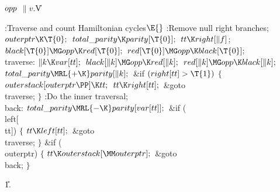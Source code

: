 \Y\B\4\D$\\{opp}$ \5
$\|v.{}$\|V\par
\Y\B\4:Traverse and count Hamiltonian cycles\X${}\E{}$\6
:Remove null right branches\X;\6
${}\\{outerptr}\K\T{0};{}$\6
${}\\{total\_parity}\K\\{parity}[\T{0}];{}$\6
${}\\{tt}\K\\{right}[\|f]{}$;\6
${}\\{black}[\T{0}]\MG\\{opp}\K\\{red}[\T{0}];{}$\6
${}\\{red}[\T{0}]\MG\\{opp}\K\\{black}[\T{0}];{}$\6
\4\\{traverse}:\5
${}\|k\K\\{var}[\\{tt}];{}$\6
${}\\{black}[\|k]\MG\\{opp}\K\\{red}[\|k];{}$\6
${}\\{red}[\|k]\MG\\{opp}\K\\{black}[\|k];{}$\6
${}\\{total\_parity}\MRL{+{\K}}\\{parity}[\|k];{}$\6
\&{if} ${}(\\{right}[\\{tt}]>\T{1}){}$\5
${}\{{}$\1\6
${}\\{outerstack}[\\{outerptr}\PP]\K\\{tt};{}$\6
${}\\{tt}\K\\{right}[\\{tt}];{}$\6
\&{goto} \\{traverse};\6
\4${}\}{}$\2\6
:Do the inner traversal\X;\6
\4\\{back}:\5
${}\\{total\_parity}\MRL{-{\K}}\\{parity}[\\{var}[\\{tt}]];{}$\6
\&{if} (\\{left}[\\{tt}])\5
${}\{{}$\1\6
${}\\{tt}\K\\{left}[\\{tt}];{}$\6
\&{goto} \\{traverse};\6
\4${}\}{}$\2\6
\&{if} (\\{outerptr})\5
${}\{{}$\1\6
${}\\{tt}\K\\{outerstack}[\MM\\{outerptr}];{}$\6
\&{goto} \\{back};\6
\4${}\}{}$\2\par
\U1.\fi

